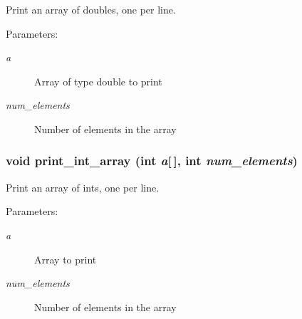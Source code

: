 Print an array of doubles, one per line. \begin{Desc}
\item[Parameters:]
\begin{description}
\item[{\em a}]Array of type double to print \item[{\em num\_\-elements}]Number of elements in the array \end{description}
\end{Desc}
\subsubsection{\setlength{\rightskip}{0pt plus 5cm}void print\_\-int\_\-array (int {\em a}[$\,$], int {\em num\_\-elements})}\label{print__arrays_8h_095c9149423818a7dbfe4003e5940f97}


Print an array of ints, one per line. \begin{Desc}
\item[Parameters:]
\begin{description}
\item[{\em a}]Array to print \item[{\em num\_\-elements}]Number of elements in the array \end{description}
\end{Desc}
